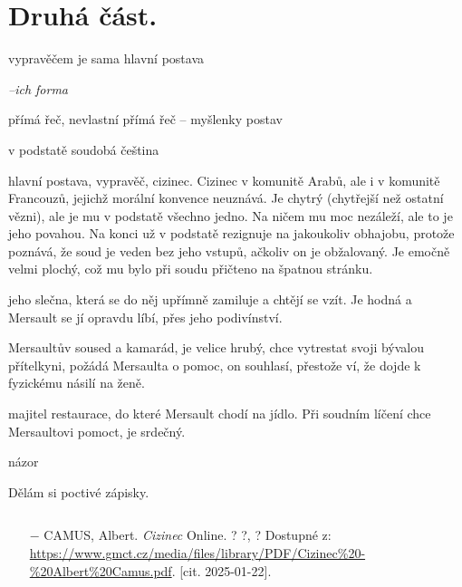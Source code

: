 \documentclass{article}
\begin{document}
\section{Druhá část.}
\begin{description}
    \setlength\itemsep{0.15em}
    \item[vypravěč:] vypravěčem je sama hlavní postava
    \item[vyprávěcí způsoby:] \textit{--ich forma}
    \item[typy promluv:] přímá řeč, nevlastní přímá řeč -- myšlenky postav
    \item[jazyková stránka:] v podstatě soudobá čeština
    \item[postavy:]
        \begin{description}
            \setlength\itemsep{0.15em}
           	\item[Mersault,] hlavní postava, vypravěč, cizinec. Cizinec v komunitě Arabů, ale i v komunitě Francouzů, jejichž morální konvence
                neuznává. Je chytrý (chytřejší než ostatní vězni), ale je mu v podstatě všechno jedno. Na ničem mu moc nezáleží, ale to je
                jeho povahou. Na konci už v podstatě rezignuje na jakoukoliv obhajobu, protože poznává, že soud je veden bez jeho vstupů,
                ačkoliv on je obžalovaný. Je emočně velmi plochý, což mu bylo při soudu přičteno na špatnou stránku.
            \item[Marie,] jeho slečna, která se do něj upřímně zamiluje a chtějí se vzít. Je hodná a Mersault se jí opravdu líbí, přes
                jeho podivínství.
            \item[Raymond,] Mersaultův soused a kamarád, je velice hrubý, chce vytrestat svoji bývalou přítelkyni, požádá Mersaulta o pomoc,
                on souhlasí, přestože ví, že dojde k fyzickému násilí na ženě.
            \item[Céleste,] majitel restaurace, do které Mersault chodí na jídlo. Při soudním líčení chce Mersaultovi pomoct, je srdečný.
        \end{description}
    \item[názor:] názor
    \item[kontext:]  Dělám si poctivé zápisky.
    \item[zdroje:] $ $
    \begin{itemize}
        \setlength\itemsep{0em}
        \item[$-$] CAMUS, Albert. \textit{Cizinec} Online. ? ?, ? Dostupné z: \url{https://www.gmct.cz/media/files/library/PDF/Cizinec%20-%20Albert%20Camus.pdf}. [cit. 2025-01-22].
    \end{itemize}
\end{description}
\end{document}
